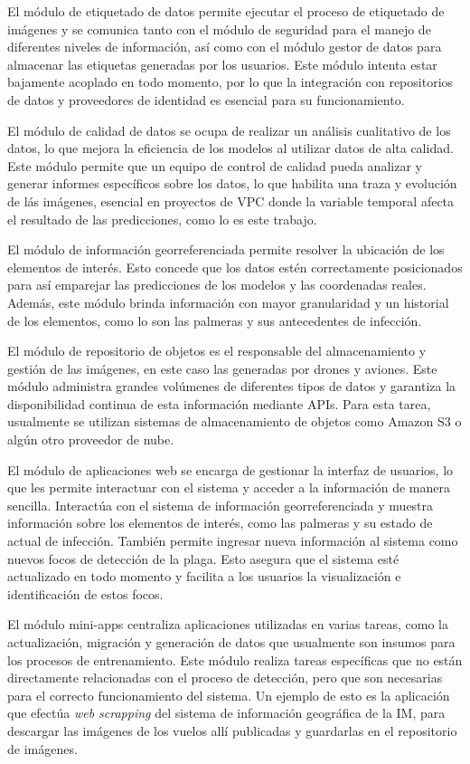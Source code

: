 El módulo de etiquetado de datos permite ejecutar el proceso de etiquetado de imágenes y se comunica tanto con el módulo de seguridad para el manejo de diferentes niveles de información, así como con el módulo gestor de datos para almacenar las etiquetas generadas por los usuarios. Este módulo intenta estar bajamente acoplado en todo momento, por lo que la integración con repositorios de datos y proveedores de identidad es esencial para su funcionamiento.

El módulo de calidad de datos se ocupa de realizar un análisis cualitativo de los datos, lo que mejora la eficiencia de los modelos al utilizar datos de alta calidad. Este módulo permite que un equipo de control de calidad pueda analizar y generar informes específicos sobre los datos, lo que habilita una traza y evolución de lás imágenes, esencial en proyectos de VPC donde la variable temporal afecta el resultado de las predicciones, como lo es este trabajo.

El módulo de información georreferenciada permite resolver la ubicación de los elementos de interés. Esto concede que los datos estén correctamente posicionados para así emparejar las predicciones de los modelos y las coordenadas reales. Además, este módulo brinda información con mayor granularidad y un historial de los elementos, como lo son las palmeras y sus antecedentes de infección.

El módulo de repositorio de objetos es el responsable del almacenamiento y gestión de las imágenes, en este caso las generadas por drones y aviones. Este módulo administra grandes volúmenes de diferentes tipos de datos y garantiza la disponibilidad continua de esta información mediante APIs. Para esta tarea, usualmente se utilizan sistemas de almacenamiento de objetos como Amazon S3 \citep{amazon_web_services_aws_nodate} o algún otro proveedor de nube.

El módulo de aplicaciones web se encarga de gestionar la interfaz de usuarios, lo que les permite interactuar con el sistema y acceder a la información de manera sencilla. Interactúa con el sistema de información georreferenciada y muestra información sobre los elementos de interés, como las palmeras y su estado de actual de infección. También permite ingresar nueva información al sistema como nuevos focos de detección de la plaga. Esto asegura que el sistema esté actualizado en todo momento y facilita a los usuarios la visualización e identificación de estos focos.

El módulo mini-apps centraliza aplicaciones utilizadas en varias tareas, como la actualización, migración y generación de datos que usualmente son insumos para los procesos de entrenamiento. Este módulo realiza tareas específicas que no están directamente relacionadas con el proceso de detección, pero que son necesarias para el correcto funcionamiento del sistema. Un ejemplo de esto es la aplicación que efectúa \textit{web scrapping} del sistema de información geográfica de la IM, para descargar las imágenes de los vuelos allí publicadas y guardarlas en el repositorio de imágenes.

